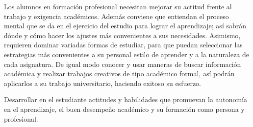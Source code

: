 \begin{syllabus}


\begin{justification}
Los alumnos en formación profesional necesitan mejorar su actitud frente al trabajo y exigencia académicos. Además conviene que entiendan el proceso mental que se da en el ejercicio del estudio para lograr el aprendizaje; así  sabrán dónde y cómo hacer los ajustes más convenientes a sus necesidades. Asimismo, requieren dominar variadas formas de estudiar, para que puedan seleccionar las estrategias  más convenientes a su personal estilo de aprender y a la naturaleza de cada asignatura. De igual modo conocer y usar  maneras de buscar información académica y realizar trabajos creativos de tipo académico formal, así podrán  aplicarlos a su trabajo universitario, haciendo exitoso su esfuerzo.
\end{justification}

\begin{goals}
\item Desarrollar en el estudiante actitudes y habilidades que promuevan la autonomía en el aprendizaje, el buen desempeño académico y su formación como persona y profesional.
\end{goals}

\begin{outcomes}
    \item {}
    \item {}
    \item {}
\end{outcomes}

\begin{competences}
    \item {}
    \item {}
\end{competences}


\end{syllabus}
